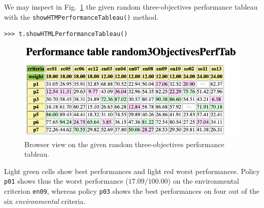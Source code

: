 We may inspect in Fig.~\ref{fig:6.3} the given random three-objectives performance tableau with the \texttt{showHTMPerformanceTableau()} method.
\begin{lstlisting}
>>> t.showHTMLPerformanceTableau()
\end{lstlisting}
\begin{figure}[h]
\includegraphics[width=12cm]{Figures/random3ObjPerfTab.png}
\caption{Browser view on the given random three-objectives performance tableau.}
\label{fig:6.3}       %
\end{figure}
Light green cells show best performances and light red worst performances. Policy \texttt{p01} shows thus the worst performance ($17.09/100.00$) on the environmental criterion \texttt{en09}, whereas policy \texttt{p03} shows the best performances on four out of the six \emph{environmental} criteria.

